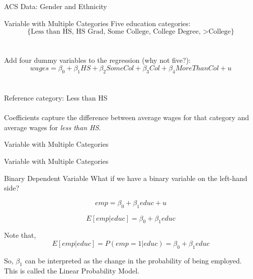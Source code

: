 \documentclass{./../div_teaching_slides}
\begin{document}
\begin{frame}{ACS Data: Gender and Ethnicity}
\vspace{-0.1em}
\centering  \small  
 \\ \vspace{1.5em}
\end{frame}

\begin{frame}{Variable with Multiple Categories}
	Five education categories:
	 $$ \{\text{Less than HS, HS Grad, Some College, College Degree, >College} \} $$ \\~\\
	 Add four dummy variables to the regression (why not five?):
	 $$ wages = \beta_0 + \beta_1 HS + \beta_2 SomeCol + \beta_3 Col + \beta_4 MoreThanCol +  u  $$ \\~\\
	 Reference category: Less than HS \\~\\
	 Coefficients capture the difference between average wages for that category and average wages for \textit{less than HS}. 
\end{frame}

\begin{frame}{Variable with Multiple Categories}
\centering \vspace{1em}

\end{frame}

\begin{frame}{Variable with Multiple Categories}
\centering \vspace{-0.5em} \footnotesize

\end{frame}

\begin{frame}{Binary Dependent Variable}
What if we have a binary variable on the left-hand side?

$$ emp = \beta_0 + \beta_1 educ  + u  $$

$$ E[emp|educ] = \beta_0 + \beta_1 educ    $$

Note that, 
$$ E[emp|educ] = P(emp=1|educ) = \beta_0 + \beta_1 educ $$ 

So, $\beta_1$ can be interpreted as the change in the probability of being employed. This is called the Linear Probability Model.
\end{frame}
\end{document}
